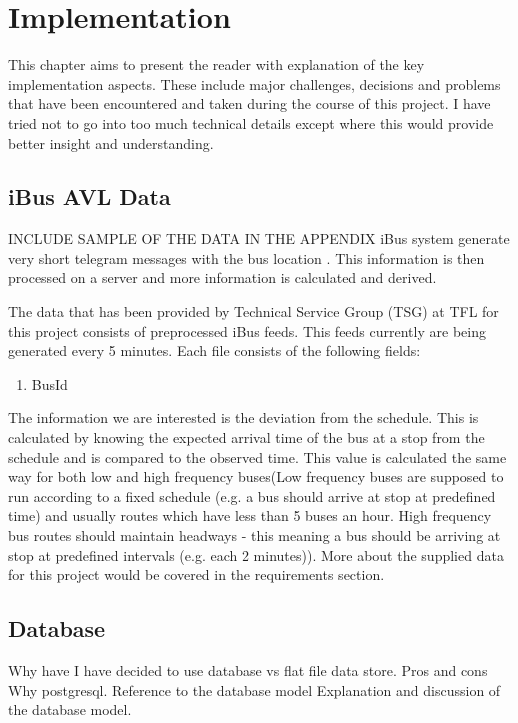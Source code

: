 \chapter{Implementation}
This chapter aims to present the reader with explanation of the key implementation aspects. These include major challenges, decisions and problems that have been encountered and taken during the course of this project. I have tried not to go into too much technical details except where this would provide better insight and understanding.

\section{iBus AVL Data}
INCLUDE SAMPLE OF THE DATA IN THE APPENDIX
iBus system generate very short telegram messages with the bus location \cite{Hounsell201276}. This information is then processed on a server and more information is calculated and derived.

The data that has been provided by Technical Service Group (TSG) at TFL for this project consists of preprocessed iBus feeds. This feeds currently are being generated every 5 minutes. Each file consists of the following fields:
\begin{enumerate}
\item BusId
\end{enumerate}

The information we are interested is the deviation from the schedule. This is calculated by knowing the expected arrival time of the bus at a stop from the schedule and is compared to the observed time. This value is calculated the same way for both low and high frequency buses(Low frequency buses are supposed to run according to a fixed schedule (e.g. a bus should arrive at stop at predefined time) and usually routes which have less than 5 buses an hour. High frequency bus routes should maintain headways - this meaning a bus should be arriving at stop at predefined intervals (e.g. each 2 minutes)). More about the supplied data for this project would be covered in the requirements section.

\section{Database}
Why have I have decided to use database vs flat file data store. Pros and cons
Why postgresql. Reference to the database model
Explanation and discussion of the database model.

